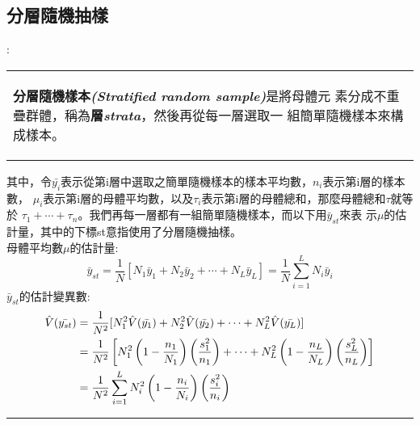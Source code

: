 		\subsection{分層隨機抽樣{}}:			
		\begin{center}\colorbox{slight}{
				\begin{tabular}{p{}}
					\begin{de}\label{de:stratified}
						\textbf{分層隨機樣本\emph{(Stratified random sample)}}是將母體元							素分成不重疊群體，稱為\textbf{層\emph{strata}}，然後再從每一層選取一							組簡單隨機樣本來構成樣本。
					\end{de}
				\end{tabular}
			}
		\end{center}		
		
		其中，令$\bar{y_i}$表示從第i層中選取之簡單隨機樣本的樣本平均數，$n_i$表示第i層的樣本數，			$\mu_i$表示第i層的母體平均數，以及$\tau_i$表示第i層的母體總和，那麼母體總和$\tau$就等於			$\tau_1+\cdots+\tau_n$。我們再每一層都有一組簡單隨機樣本，而以下用$\bar{y}_{st}$來表			示$\mu$的估計量，其中的下標st意指使用了分層隨機抽樣。\\		
		母體平均數$\mu$的估計量:
		$$ \bar{y}_{st}=\frac{1}{N} [ N_1\bar{y}_1+N_2\bar{y}_2+\cdots+N_L\bar{y}_L ] 			=\frac{1}{N}\sum^{L}_{i=1} N_i \bar{y}_i$$
		$\bar{y}_{st}$的估計變異數:\begin{equation}\notag
		\begin{aligned} 
		 \hat{V}(\bar{y_{st}}) &= \frac{1}{N^2}[N^2_1\hat{V}(\bar{y_1})+N^2_2\hat{V}			(\bar{y_2})+\cdots+N^2_L\hat{V}(\bar{y_L})]\\
		 &=\frac{1}{N^2}\left[ N^2_1 \left( 1-\frac{n_1}{N_1} \right) \left( 					\frac{s^2_1}{n_1} \right)+ \cdots +N^2_L \left( 1-\frac{n_L}{N_L} \right) 				\left( \frac{s^2_L}{n_L} \right) \right] \\
		 &= \frac{1}{N^2} \sum^L_{i=1} N^2_i \left( 1-\frac{n_i}{N_i} \right) 					\left( \frac{s^2_i}{n_i} \right) 
		 \end{aligned}
		\end{equation}
		\rule{\textwidth}{0.2pt}
